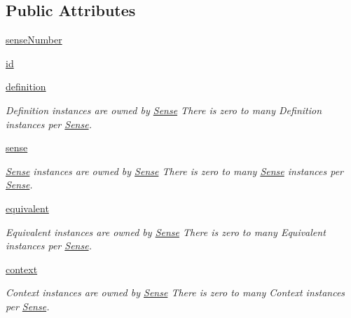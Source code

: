 \subsection*{Public Attributes}
\begin{DoxyCompactItemize}
\item 
\hyperlink{classlmf_1_1src_1_1core_1_1sense_1_1_sense_ab511b70da3012cc5a0254f34dd30170c}{sense\+Number}
\item 
\hyperlink{classlmf_1_1src_1_1core_1_1sense_1_1_sense_ae0febecc9ab2951c5c6bb82f675187bc}{id}
\item 
\hyperlink{classlmf_1_1src_1_1core_1_1sense_1_1_sense_a9adfd8936ecd6626cba82193e068e09e}{definition}
\begin{DoxyCompactList}\small\item\em Definition instances are owned by \hyperlink{classlmf_1_1src_1_1core_1_1sense_1_1_sense}{Sense} There is zero to many Definition instances per \hyperlink{classlmf_1_1src_1_1core_1_1sense_1_1_sense}{Sense}. \end{DoxyCompactList}\item 
\hyperlink{classlmf_1_1src_1_1core_1_1sense_1_1_sense_a51524fd8eb1bc869c2ecfc681339d8aa}{sense}
\begin{DoxyCompactList}\small\item\em \hyperlink{classlmf_1_1src_1_1core_1_1sense_1_1_sense}{Sense} instances are owned by \hyperlink{classlmf_1_1src_1_1core_1_1sense_1_1_sense}{Sense} There is zero to many \hyperlink{classlmf_1_1src_1_1core_1_1sense_1_1_sense}{Sense} instances per \hyperlink{classlmf_1_1src_1_1core_1_1sense_1_1_sense}{Sense}. \end{DoxyCompactList}\item 
\hyperlink{classlmf_1_1src_1_1core_1_1sense_1_1_sense_a94d3b05f734fbe8898902ae948d30ce5}{equivalent}
\begin{DoxyCompactList}\small\item\em Equivalent instances are owned by \hyperlink{classlmf_1_1src_1_1core_1_1sense_1_1_sense}{Sense} There is zero to many Equivalent instances per \hyperlink{classlmf_1_1src_1_1core_1_1sense_1_1_sense}{Sense}. \end{DoxyCompactList}\item 
\hyperlink{classlmf_1_1src_1_1core_1_1sense_1_1_sense_ae2b3da0233748116d4415cc107b6e4c2}{context}
\begin{DoxyCompactList}\small\item\em Context instances are owned by \hyperlink{classlmf_1_1src_1_1core_1_1sense_1_1_sense}{Sense} There is zero to many Context instances per \hyperlink{classlmf_1_1src_1_1core_1_1sense_1_1_sense}{Sense}. \end{DoxyCompactList}\item 

\end{DoxyCompactItemize}
